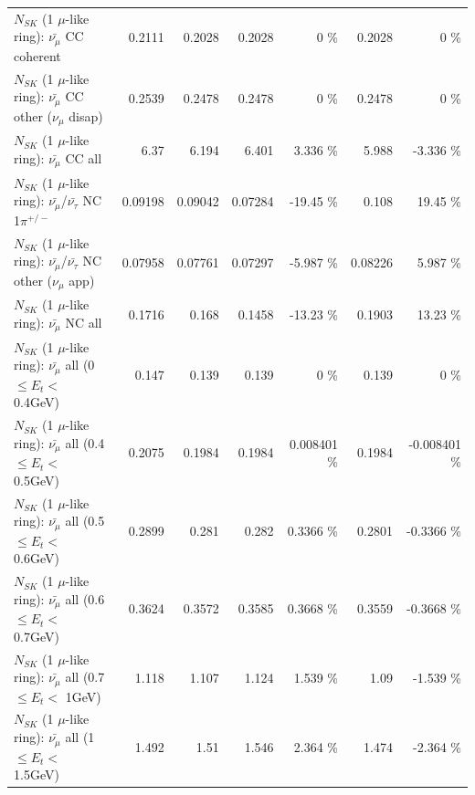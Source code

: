 \begin{table}
\begin{tabular}{| l | r | r | r  r | r  r |}
                       $N_{SK}$ (1 $\mu$-like ring): $\bar{\nu_\mu}$ CC coherent &          0.2111 &          0.2028 &          0.2028 &        0 \%  &          0.2028 &        0 \%  \\ 
        $N_{SK}$ (1 $\mu$-like ring): $\bar{\nu_\mu}$ CC other ($\nu_\mu$ disap) &          0.2539 &          0.2478 &          0.2478 &        0 \%  &          0.2478 &        0 \%  \\ 
                          $N_{SK}$ (1 $\mu$-like ring): $\bar{\nu_{\mu}}$ CC all &            6.37 &           6.194 &           6.401 &    3.336 \%  &           5.988 &   -3.336 \%  \\ 
\hline
  $N_{SK}$ (1 $\mu$-like ring): $\bar{\nu_\mu}$/$\bar{\nu_\tau}$ NC 1$\pi^{+/-}$ &         0.09198 &         0.09042 &         0.07284 &   -19.45 \%  &           0.108 &    19.45 \%  \\ 
$N_{SK}$ (1 $\mu$-like ring): $\bar{\nu_\mu}$/$\bar{\nu_\tau}$ NC other ($\nu_\mu$ app) &         0.07958 &         0.07761 &         0.07297 &   -5.987 \%  &         0.08226 &    5.987 \%  \\ 
                          $N_{SK}$ (1 $\mu$-like ring): $\bar{\nu_{\mu}}$ NC all &          0.1716 &           0.168 &          0.1458 &   -13.23 \%  &          0.1903 &    13.23 \%  \\ 
\hline
   $N_{SK}$ (1 $\mu$-like ring): $\bar{\nu_{\mu}}$ all (0 $\leq E_{t} <$ 0.4GeV) &           0.147 &           0.139 &           0.139 &        0 \%  &           0.139 &        0 \%  \\ 
 $N_{SK}$ (1 $\mu$-like ring): $\bar{\nu_{\mu}}$ all (0.4 $\leq E_{t} <$ 0.5GeV) &          0.2075 &          0.1984 &          0.1984 & 0.008401 \%  &          0.1984 & -0.008401 \%  \\ 
 $N_{SK}$ (1 $\mu$-like ring): $\bar{\nu_{\mu}}$ all (0.5 $\leq E_{t} <$ 0.6GeV) &          0.2899 &           0.281 &           0.282 &   0.3366 \%  &          0.2801 &  -0.3366 \%  \\ 
 $N_{SK}$ (1 $\mu$-like ring): $\bar{\nu_{\mu}}$ all (0.6 $\leq E_{t} <$ 0.7GeV) &          0.3624 &          0.3572 &          0.3585 &   0.3668 \%  &          0.3559 &  -0.3668 \%  \\ 
   $N_{SK}$ (1 $\mu$-like ring): $\bar{\nu_{\mu}}$ all (0.7 $\leq E_{t} <$ 1GeV) &           1.118 &           1.107 &           1.124 &    1.539 \%  &            1.09 &   -1.539 \%  \\ 
   $N_{SK}$ (1 $\mu$-like ring): $\bar{\nu_{\mu}}$ all (1 $\leq E_{t} <$ 1.5GeV) &           1.492 &            1.51 &           1.546 &    2.364 \%  &           1.474 &   -2.364 \%  \\ 

\end{tabular}
\end{table}
